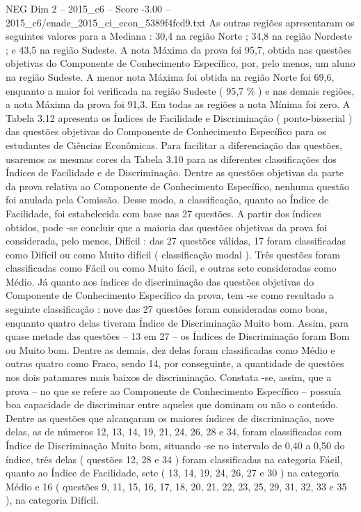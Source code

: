 \begin{textsample}{NEG Dim 2 – 2015\_c6 – Score -3.00 – 2015\_c6/enade\_2015\_ci\_econ\_5389f4fcd9.txt}
As outras regiões apresentaram os seguintes valores para a Mediana : 30,4 na região Norte ; 34,8 na região Nordeste ; e 43,5 na região Sudeste.
A nota Máxima da prova foi 95,7, obtida nas questões objetivas do Componente de Conhecimento Específico, por, pelo menos, um aluno na região Sudeste.
A menor nota Máxima foi obtida na região Norte foi 69,6, enquanto a maior foi verificada na região Sudeste ( 95,7 \% ) e nas demais regiões, a nota Máxima da prova foi 91,3.
Em todas as regiões a nota Mínima foi zero.
A Tabela 3.12 apresenta os Índices de Facilidade e Discriminação ( ponto-bisserial ) das questões objetivas do Componente de Conhecimento Específico para os estudantes de Ciências Econômicas.
Para facilitar a diferenciação das questões, usaremos as mesmas cores da Tabela 3.10 para as diferentes classificações dos Índices de Facilidade e de Discriminação.
Dentre as questões objetivas da parte da prova relativa ao Componente de Conhecimento Específico, nenhuma questão foi anulada pela Comissão.
Desse modo, a classificação, quanto ao Índice de Facilidade, foi estabelecida com base nas 27 questões.
A partir dos índices obtidos, pode -se concluir que a maioria das questões objetivas da prova foi considerada, pelo menos, Difícil : das 27 questões válidas, 17 foram classificadas como Difícil ou como Muito difícil ( classificação modal ).
Três questões foram classificadas como Fácil ou como Muito fácil, e outras sete consideradas como Médio.
Já quanto aos índices de discriminação das questões objetivas do Componente de Conhecimento Específico da prova, tem -se como resultado a seguinte classificação : nove das 27 questões foram consideradas como boas, enquanto quatro delas tiveram Índice de Discriminação Muito bom.
Assim, para quase metade das questões – 13 em 27 – os Índices de Discriminação foram Bom ou Muito bom.
Dentre as demais, dez delas foram classificadas como Médio e outras quatro como Fraco, sendo 14, por conseguinte, a quantidade de questões nos dois patamares mais baixos de discriminação.
Constata -se, assim, que a prova – no que se refere ao Componente de Conhecimento Específico – possuía boa capacidade de discriminar entre aqueles que dominam ou não o conteúdo.
Dentre as questões que alcançaram os maiores índices de discriminação, nove delas, as de números 12, 13, 14, 19, 21, 24, 26, 28 e 34, foram classificadas com Índice de Discriminação Muito bom, situando -se no intervalo de 0,40 a 0,50 do índice, três delas ( questões 12, 28 e 34 ) foram classificadas na categoria Fácil, quanto ao Índice de Facilidade, sete ( 13, 14, 19, 24, 26, 27 e 30 ) na categoria Médio e 16 ( questões 9, 11, 15, 16, 17, 18, 20, 21, 22, 23, 25, 29, 31, 32, 33 e 35 ), na categoria Difícil.

\end{textsample}
